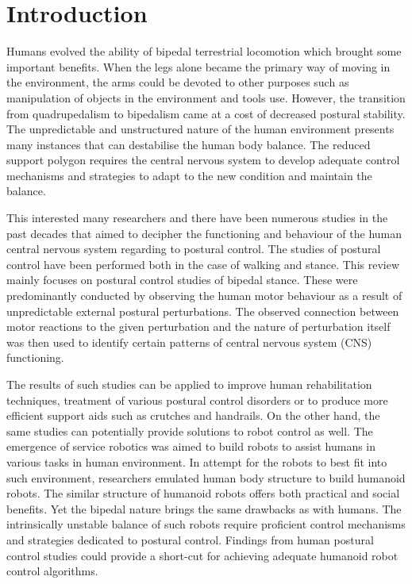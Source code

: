 \documentclass[12pt,a4paper,twoside]{article}
\begin{document}
\section{{Introduction}}
\label{sec:introduction}
Humans evolved the ability of bipedal terrestrial locomotion which brought some important benefits. When the legs alone became the primary way of moving in the environment, the arms could be devoted to other purposes such as manipulation of objects in the environment and tools use. However, the transition from quadrupedalism to bipedalism came at a cost of decreased postural stability. The unpredictable and unstructured nature of the human environment presents many instances that can destabilise the human body balance. The reduced support polygon requires the central nervous system to develop adequate control mechanisms and strategies to adapt to the new condition and maintain the balance.

This interested many researchers and there have been numerous studies in the past decades that aimed to decipher the functioning and behaviour of the human central nervous system regarding to postural control. The studies of postural control have been performed both in the case of walking and stance. This review mainly focuses on postural control studies of bipedal stance. These were predominantly conducted by observing the human motor behaviour as a result of unpredictable external postural perturbations. The observed connection between motor reactions to the given perturbation and the nature of perturbation itself was then used to identify certain patterns of central nervous system (CNS) functioning.

The results of such studies can be applied to improve human rehabilitation techniques, treatment of various postural control disorders or to produce more efficient support aids such as crutches and handrails. On the other hand, the same studies can potentially provide solutions to robot control as well. The emergence of service robotics was aimed to build robots to assist humans in various tasks in human environment. In attempt for the robots to best fit into such environment, researchers emulated human body structure to build humanoid robots. The similar structure of humanoid robots offers both practical and social benefits. Yet the bipedal nature brings the same drawbacks as with humans. The intrinsically unstable balance of such robots require proficient control mechanisms and strategies dedicated to postural control. Findings from human postural control studies could provide a short-cut for achieving adequate humanoid robot control algorithms.
\end{document}
